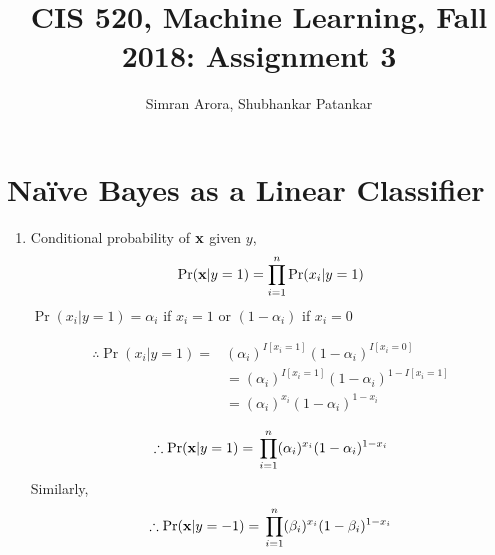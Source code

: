 \documentclass[english]{article}
\title{CIS 520, Machine Learning, Fall 2018: Assignment 3}
\date{}
\author{Simran Arora, Shubhankar Patankar}
\begin{document}
\maketitle

\section{Na{\"i}ve Bayes as a Linear Classifier}

\begin{enumerate}
\item Conditional probability of $\mathbf{x}$ given $y$, \\
$$\Pr(\mathbf{x} | y = 1) = \prod_{i = 1}^{n}\Pr(x_i | y = 1)$$
$\Pr(x_i | y = 1) = \alpha_i$ if $x_i = 1$ or $(1 - \alpha_i)$ if $x_i = 0$

\begin{align*}
\therefore \Pr(x_i | y = 1) {}={} & ({\alpha_i})^{I[x_i = 1]}({1 - \alpha_i})^{I[x_i = 0]} \\
& = ({\alpha_i})^{I[x_i = 1]}({1 - \alpha_i})^{1 - I[x_i = 1]} \\
& = ({\alpha_i})^{x_i}({1 - \alpha_i})^{1 - x_i} \\
\end{align*}
\begin{align*}
\therefore \Pr(\mathbf{x} | y = 1) {}={} \prod_{i = 1}^{n}({\alpha_i})^{x_i}({1 - \alpha_i})^{1 - x_i}
\end{align*}
Similarly,
\begin{align*}
\therefore \Pr(\mathbf{x} | y = -1) {}={} \prod_{i = 1}^{n}({\beta_i})^{x_i}({1 - \beta_i})^{1 - x_i}
\end{align*}


\end{enumerate}
\end{document}
